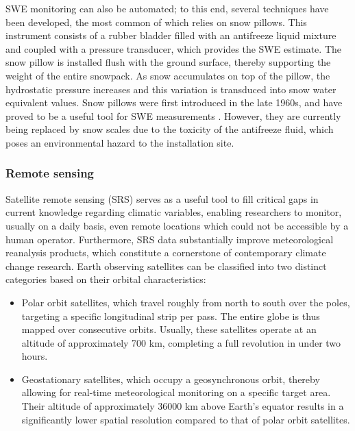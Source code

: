 SWE monitoring can also be automated; to this end, several techniques have been developed, the most common of which relies on snow pillows. This 
instrument consists of a rubber bladder filled with an antifreeze liquid mixture  and coupled with a pressure transducer, which provides the SWE 
estimate. The snow pillow is installed flush with the ground surface, thereby supporting the weight of the entire snowpack. As snow accumulates on 
top of the pillow, the hydrostatic pressure increases and this variation is transduced into snow water equivalent values. Snow pillows were first 
introduced in the late 1960s, and have proved to be a useful tool for SWE measurements \parencite{SnowPillow_Hood}. However, they are currently 
being replaced by snow scales due to the toxicity of the antifreeze fluid, which poses an environmental hazard to the installation site.



\subsubsection{Remote sensing}

Satellite remote sensing (SRS) serves as a useful tool to fill critical gaps in current knowledge regarding climatic variables, enabling researchers 
to monitor, usually on a daily basis, even remote locations which could not be accessible by a human operator. Furthermore, SRS data substantially 
improve meteorological reanalysis products, which constitute a cornerstone of contemporary climate change research. Earth observing satellites can be 
classified into two distinct categories based on their orbital characteristics:

\begin{itemize}[label=$\blacktriangleright$]    
    \item Polar orbit satellites, which travel roughly from north to south over the poles, targeting a specific longitudinal strip per pass. The 
    entire globe is thus mapped over consecutive orbits. Usually, these satellites operate at an altitude of approximately 700 km, completing a full 
    revolution in under two hours.
    \item Geostationary satellites, which occupy a geosynchronous orbit, thereby allowing for real-time meteorological monitoring on a specific target 
    area. Their altitude of approximately 36000 km above Earth's equator results in a significantly lower spatial resolution compared to that of 
    polar orbit satellites.
\end{itemize}

